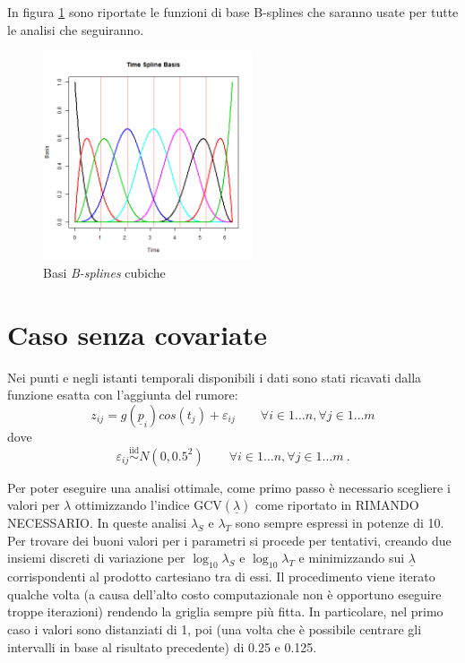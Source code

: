 \documentclass[a4paper,11pt,twoside,openright]{book}							%
\begin{document}
In figura \ref{fig:DomC_BSpline} sono riportate le funzioni di base B-splines che saranno usate per tutte le analisi che seguiranno.

\begin{figure}[h]
	\centering
	\includegraphics[width=0.55\textwidth]{Immagini/DomC_timebasis.png}   
	\caption{Basi \textit{B-splines} cubiche}
	\label{fig:DomC_BSpline}
\end{figure}

\newpage

\section{Caso senza covariate}
Nei punti e negli istanti temporali disponibili i dati sono stati ricavati dalla funzione esatta con l'aggiunta del rumore:
$$
z_{ij}=g(\underline p_{i})cos(t_j) + \varepsilon_{ij} \qquad \forall i \in 1\ldots n, \forall j \in 1\ldots m
$$
dove
$$
\varepsilon_{ij}\stackrel{\mathrm{iid}}{\sim}N(0,0.5^2) \qquad \forall i \in 1\ldots n, \forall j \in 1\ldots m \ .
$$

Per poter eseguire una analisi ottimale, come primo passo è necessario scegliere i valori per $\lambda$ ottimizzando l'indice $\mathrm{GCV}(\underline \lambda)$ come riportato in RIMANDO NECESSARIO. In queste analisi $\lambda_S$ e $\lambda_T$ sono sempre espressi in potenze di 10. Per trovare dei buoni valori per i parametri si procede per tentativi, creando due insiemi discreti di variazione per $\log_{10}\lambda_S$ e $\log_{10}\lambda_T$ e minimizzando sui $\underline \lambda$ corrispondenti al prodotto cartesiano tra di essi. Il procedimento viene iterato qualche volta (a causa dell'alto costo computazionale non è opportuno eseguire troppe iterazioni) rendendo la griglia sempre più fitta. In particolare, nel primo caso i valori sono distanziati di 1, poi (una volta che è possibile centrare gli intervalli in base al risultato precedente) di 0.25 e 0.125.
\end{document}
